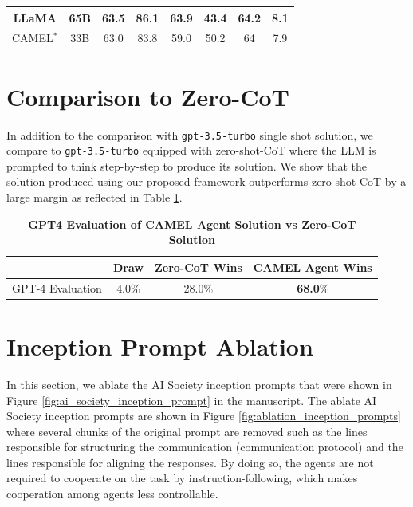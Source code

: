 \begin{table}[h!]
{\begin{tabular}{lccccc|c|c}
\multicolumn{1}{c}{\multirow{-2}{*}{{\color[HTML]{656565} LLaMA}}} & {\color[HTML]{656565} 65B} & {\color[HTML]{656565} 63.5}                                            & {\color[HTML]{656565} 86.1}                                               & {\color[HTML]{656565} 63.9}                                          & {\color[HTML]{656565} 43.4}                                         & {\color[HTML]{656565} 64.2} & {\color[HTML]{656565} 8.1} \\ \hline
CAMEL$^*$ & 33B & 63.0 & 83.8 & 59.0 & 50.2 & 64 & 7.9 \\ \hline
\end{tabular}}
\end{table}

\section{Comparison to Zero-CoT}

In addition to the comparison with \texttt{gpt-3.5-turbo} single shot solution, we compare to \texttt{gpt-3.5-turbo} equipped with zero-shot-CoT \cite{kojima2022large} where the LLM is prompted to think step-by-step to produce its solution. We show that the solution produced using our proposed framework outperforms zero-shot-CoT by a large margin as reflected in Table \ref{zeroshotcot}.  
\begin{table}[h!]
\caption{\textbf{GPT4 Evaluation of CAMEL Agent Solution vs Zero-CoT Solution}}
\label{zeroshotcot}
\centering
\begin{tabular}{lccc}
\toprule
\textbf{} & \textbf{Draw} & \textbf{Zero-CoT Wins} & \textbf{CAMEL Agent Wins} \\
\midrule
GPT-4 Evaluation & 4.0\% & 28.0\% & \textbf{68.0}\% \\
\bottomrule
\end{tabular}
\end{table}

\clearpage

\section{Inception Prompt Ablation}

In this section, we ablate the AI Society inception prompts that were shown in Figure \ref{fig:ai_society_inception_prompt} in the manuscript. The ablate AI Society inception prompts are shown in Figure \ref{fig:ablation_inception_prompts} where several chunks of the original prompt are removed such as the lines responsible for structuring the communication (communication protocol) and the lines responsible for aligning the responses. By doing so, the agents are not required to cooperate on the task by instruction-following, which makes cooperation among agents less controllable.



